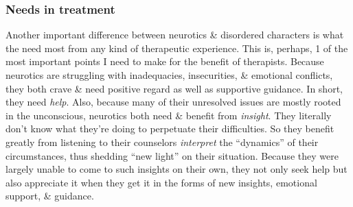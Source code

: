 \documentclass{article}
\numberwithin{equation}{section}
\begin{document}
\subsubsection{Needs in treatment}
Another important difference between neurotics \& disordered characters is what the need most from any kind of therapeutic experience. This is, perhaps, 1 of the most important points I need to make for the benefit of therapists. Because neurotics are struggling with inadequacies, insecurities, \& emotional conflicts, they both crave \& need positive regard as well as supportive guidance. In short, they need \textit{help}. Also, because many of their unresolved issues are mostly rooted in the unconscious, neurotics both need \& benefit from \textit{insight}. They literally don't know what they're doing to perpetuate their difficulties. So they benefit greatly from listening to their counselors \textit{interpret} the ``dynamics'' of their circumstances, thus shedding ``new light'' on their situation. Because they were largely unable to come to such insights on their own, they not only seek help but also appreciate it when they get it in the forms of new insights, emotional support, \& guidance.
\end{document}

